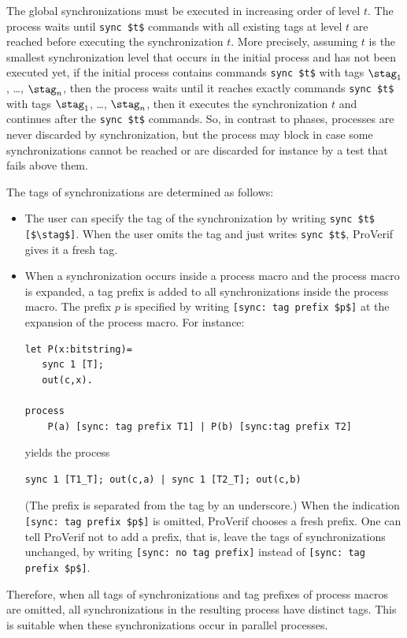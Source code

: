 \documentclass{book}
\begin{document}
The global synchronizations must be executed in
increasing order of level $t$.
The process waits until \lstinline!sync $t$!
commands with all existing tags at level $t$
are reached before executing the synchronization $t$.
More precisely, assuming $t$ is the smallest synchronization
level that occurs in the initial process and has not been executed yet,
if the initial process contains commands
\lstinline!sync $t$! with tags $\stag_1$, \dots, $\stag_n$,
then the process waits until it reaches
exactly commands \lstinline!sync $t$! with tags $\stag_1$, \dots, $\stag_n$,
then it executes
the synchronization $t$ and continues after the \lstinline!sync $t$!
commands.
So, in contrast to phases, processes are never discarded
by synchronization, but the process may block in case
some synchronizations cannot be reached or are discarded for
instance by a test that fails above them.

The tags of synchronizations are determined as follows:
\begin{itemize}
\item The user can specify the tag of the synchronization by
writing \lstinline!sync $t$ [$\stag$]!. When the user omits
the tag and just writes \lstinline!sync $t$!, ProVerif gives it
a fresh tag.

\item When a synchronization occurs inside a process macro
and the process macro is expanded, a tag prefix is added to all
synchronizations inside the process macro. The prefix $p$ is specified
by writing \lstinline![sync: tag prefix $p$]! at the expansion
of the process macro. For instance:
\begin{lstlisting}[numbers=none]
let P(x:bitstring)=
   sync 1 [T];
   out(c,x).

process
    P(a) [sync: tag prefix T1] | P(b) [sync:tag prefix T2]
\end{lstlisting}
yields the process
\begin{lstlisting}[numbers=none]
sync 1 [T1_T]; out(c,a) | sync 1 [T2_T]; out(c,b)
\end{lstlisting}
(The prefix is separated from the tag by an underscore.)
When the indication \lstinline![sync: tag prefix $p$]! is omitted, ProVerif
chooses a fresh prefix.
One can tell ProVerif not to add a prefix, that is, leave
the tags of synchronizations unchanged, by writing
\lstinline![sync: no tag prefix]! instead of
\lstinline![sync: tag prefix $p$]!.

\end{itemize}
Therefore, when all tags of synchronizations and
tag prefixes of process macros are omitted, all synchronizations
in the resulting process have distinct tags. This is
suitable when these synchronizations occur in parallel processes.
\end{document}
